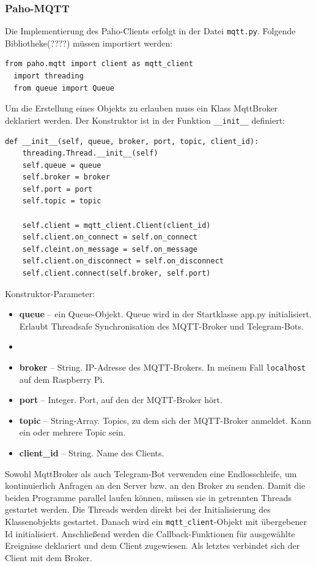\documentclass[12pt, letterpaper]{article}
\begin{document}
\subsubsection{Paho-MQTT}
\par Die Implementierung des Paho-Clients erfolgt in der Datei \texttt{mqtt.py}. Folgende Bibliotheke(????) müssen importiert werden:
\begin{lstlisting}[frame=single, style=py, caption={mqtt.py: imports}]
  from paho.mqtt import client as mqtt_client
  import threading
  from queue import Queue
\end{lstlisting}
\par Um die Erstellung eines Objekts zu erlauben muss ein Klass MqttBroker deklariert werden. Der Konstruktor ist in der Funktion \texttt{\_\_init\_\_} definiert:
\begin{lstlisting}[frame=single,style=py, caption={mqtt.py: \_\_init\_\_()}]
  def __init__(self, queue, broker, port, topic, client_id):
    threading.Thread.__init__(self)
    self.queue = queue
    self.broker = broker
    self.port = port
    self.topic = topic

    self.client = mqtt_client.Client(client_id)
    self.client.on_connect = self.on_connect
    self.cleint.on_message = self.on_message
    self.client.on_disconnect = self.on_disconnect
    self.client.connect(self.broker, self.port)
\end{lstlisting}
\par Konstruktor-Parameter:
\begin{itemize}
  \item[\textbullet] \textbf{queue} -- ein Queue-Objekt. Queue wird in der Startklasse app.py initialisiert. Erlaubt Threadsafe Synchronisation des MQTT-Broker und Telegram-Bots.
  \item[] \item[\textbullet] \textbf{broker} -- String. IP-Adresse des MQTT-Brokers. In meinem Fall \texttt{localhost} auf dem Raspberry Pi.
  \item[\textbullet] \textbf{port} -- Integer. Port, auf den der MQTT-Broker hört.
  \item[\textbullet] \textbf{topic} -- String-Array. Topics, zu dem sich der MQTT-Broker anmeldet. Kann ein oder mehrere Topic sein.
  \item[\textbullet] \textbf{client\_id} -- String. Name des Clients.
\end{itemize}
\par Sowohl MqttBroker als auch Telegram-Bot verwenden eine Endlosschleife, um kontinuierlich Anfragen an den Server bzw. an den Broker zu senden. Damit die beiden Programme parallel laufen können, müssen sie in getrennten Threads gestartet werden. Die Threads werden direkt bei der Initialisierung des Klassenobjekts gestartet. Danach wird ein \texttt{mqtt\_client}-Objekt mit übergebener Id initialisiert. Anschließend werden die Callback-Funktionen für ausgewählte Ereignisse deklariert und dem Client zugewiesen. Als letztes verbindet sich der Client mit dem Broker.
\end{document}
